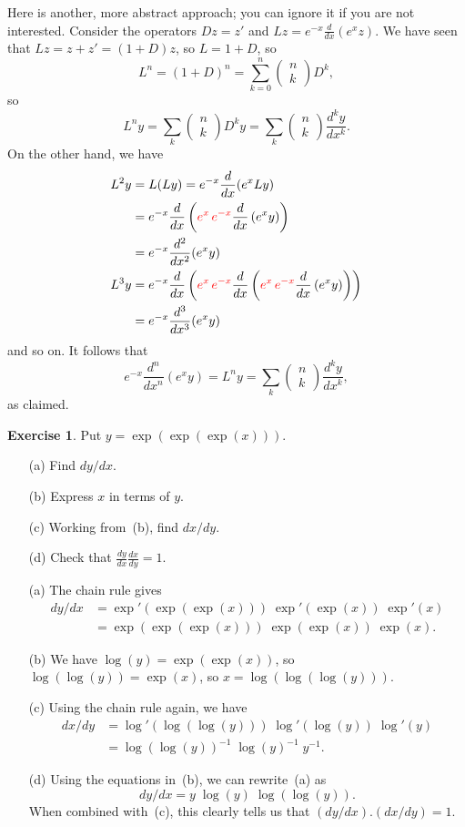 \documentclass[a4paper]{book}
\newcommand{\RED}[1]{{\color{red}#1}}
\newcommand{\bcf}[2]{\left(\begin{array}{c}{#1}\\{#2}\end{array}\right)}
\renewcommand{\:}{\colon}
\theoremstyle{definition}
\newtheorem{exercise}[theorem]{Exercise}
\renewenvironment{solution}{\SolutionInline}{\endSolutionInline}
\begin{document}
\begin{solution}
 Here is another, more abstract approach; you can ignore it if you are
 not interested.  Consider the operators $Dz=z'$ and
 $Lz=e^{-x}\frac{d}{dx}(e^xz)$.  We have seen that $Lz=z+z'=(1+D)z$,
 so $L=1+D$, so 
 \[ L^n=(1+D)^n = \sum_{k=0}^n \bcf{n}{k} D^k, \]
 so
 \[ L^ny = \sum_k \bcf{n}{k} D^ky = 
     \sum_k \bcf{n}{k}\frac{d^ky}{dx^k}.
 \]
 On the other hand, we have
 \begin{align*}
  L^2y &= L(Ly) = e^{-x}\frac{d}{dx}(e^xLy) \\
       &= e^{-x}\frac{d}{dx}\left(
           \RED{e^x\, e^{-x}}\frac{d}{dx}\left(e^x y\right)\right) \\
       &= e^{-x}\frac{d^2}{dx^2}(e^xy) \\
  L^3y &= e^{-x} \frac{d}{dx}\left( \RED{e^x \, e^{-x}}
                 \frac{d}{dx}\left( \RED{e^x \, e^{-x}}
                 \frac{d}{dx}\left( e^x y \right)\right)\right) \\
       &= e^{-x} \frac{d^3}{dx^3}(e^xy)
 \end{align*}
 and so on.  It follows that
 \[ e^{-x}\frac{d^n}{dx^n}(e^x y) = L^ny = 
         \sum_k \bcf{n}{k} \frac{d^ky}{dx^k},
 \]
 as claimed.
\end{solution}

\begin{exercise}
 Put $y=\exp(\exp(\exp(x)))$.
 \begin{itemize}
  \item[(a)] Find $dy/dx$.
  \item[(b)] Express $x$ in terms of $y$.
  \item[(c)] Working from~(b), find $dx/dy$.
  \item[(d)] Check that $\frac{dy}{dx}\frac{dx}{dy}=1$.
 \end{itemize}
\end{exercise}
\begin{solution}
 \begin{itemize}
  \item[(a)] The chain rule gives
   \begin{align*}
    dy/dx &= \exp'(\exp(\exp(x)))\;\exp'(\exp(x))\;\exp'(x) \\
          &= \exp(\exp(\exp(x)))\;\exp(\exp(x))\;\exp(x).
   \end{align*}
  \item[(b)] We have $\log(y)=\exp(\exp(x))$, so
   $\log(\log(y))=\exp(x)$, so $x=\log(\log(\log(y)))$.
  \item[(c)] Using the chain rule again, we have 
   \begin{align*}
    dx/dy &= \log'(\log(\log(y)))\;\log'(\log(y))\;\log'(y) \\
          &= \log(\log(y))^{-1}\;\log(y)^{-1}\; y^{-1}.
   \end{align*}
  \item[(d)] Using the equations in~(b), we can rewrite~(a) as 
   \[ dy/dx = y\;\log(y)\;\log(\log(y)). \]
   When combined with~(c), this clearly tells us that
   $(dy/dx).(dx/dy)=1$.  
 \end{itemize}
\end{solution}
\end{document}
